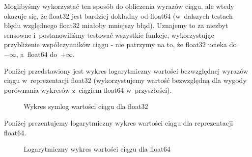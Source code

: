 Moglibyśmy wykorzystać ten sposób do obliczenia wyrazów ciągu, ale wtedy okazuje się, że float32 jest bardziej dokładny od float64 (w~dalszych testach błędu względnego float32 miałoby mniejszy błąd). Uznajemy to za niezbyt sensowne i~postanowiliśmy testować wszystkie funkcje, wykorzystując przybliżenie współczynników ciągu - nie patrzymy na to, że float32 ucieka do~$-\infty$, a~float64 do~$+\infty$. 

Poniżej przedstawiony jest wykres logarytmiczny wartości bezwzględnej wyrazów ciągu w~reprezentacji float32 (wykorzystujemy wartość bezwzględną dla wygody porównania wykresów z~ciągiem float64 w~przyszłości).
\begin{figure}[ht!]
	\caption{Wykres symlog wartości ciągu dla float32}
	\label{zad2:graph3}
\end{figure}

\newpage
Poniżej prezentujemy logarytmiczny wykres wartości ciągu dla reprezentacji float64. 
\begin{figure}[ht!]
	\caption{Logarytmiczny wykres wartości ciągu dla float64}
	\label{zad2:graph4}
\end{figure}

